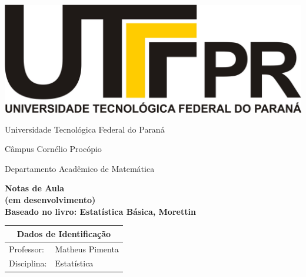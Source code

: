 \documentclass[oneside,a4paper,12pt]{article}
\newcommand{\universidade}{Universidade Tecnológica Federal do Paraná}
\newcommand{\centro}{Câmpus Cornélio Procópio}
\newcommand{\departamento}{Departamento Acadêmico de Matemática}
\newcommand{\curso}{Turma Especial}
\newcommand{\professores}{Matheus Pimenta}
\newcommand{\disciplina}{Estatística}
\begin{document}
	
	\begin{center}
		\includegraphics[width=\linewidth/8]{logo.jpg}%
	 	\vspace{2pt} 	
		
		\universidade
		\par
		\centro
		\par
		\departamento
		\par
		\par
		\vspace{12pt}
		\LARGE \textbf{Notas de Aula \\ (em desenvolvimento) \\ Baseado no livro: Estatística Básica, Morettin}
		
	\end{center}
	
	\vspace{12pt}
	
	\begin{tabular}{ |l|p{12cm}| }
		
		\hline
		\multicolumn{2}{|c|}{\textbf{Dados de Identificação}} \\
		\hline
		Professor:         &    \professores           \\
		\hline
		Disciplina:        &    \disciplina          \\
		\hline
		
	\end{tabular}
	\vspace{6pt}
	
\end{document}
